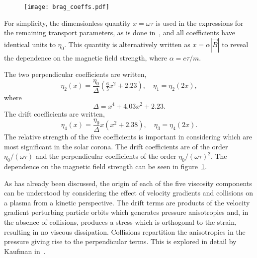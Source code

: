 \begin{figure}[t]
  \centering
  \texttt{[image: brag\_coeffs.pdf]}
\label{fig:visc_dep}%
\end{figure}

For simplicity, the dimensionless quantity $x = \omega \tau$ is used in the expressions for the remaining transport parameters, as is done in~\cite{braginskiiTransportProcessesPlasma1965}, and all coefficients have identical units to $\eta_0$. This quantity is alternatively written as $x = \alpha |\vec{B}|$ to reveal the dependence on the magnetic field strength, where $\alpha = e\tau/m$.

The two perpendicular coefficients are written,
\begin{equation}
  \label{eq:perp_visc_coeff}
  \eta_2(x) = \frac{\eta_0}{\Delta} \left( \tfrac{6}{5} x^2 + 2.23 \right), \quad \eta_1 = \eta_2(2x),
\end{equation}
where
\begin{equation}
  \label{eq:delta}
\Delta = x^4 + 4.03x^2 + 2.23.
\end{equation}
The drift coefficients are written,
\begin{equation}
  \label{eq:drift_visc_coeff}
  \eta_4(x) = \frac{\eta_0}{\Delta} x \left( x^2 + 2.38 \right), \quad \eta_3 = \eta_4(2x).
\end{equation}
The relative strength of the five coefficients is important in considering which are most significant in the solar corona. The drift coefficients are of the order $\eta_0/(\omega \tau)$ and the perpendicular coefficients of the order $\eta_0/(\omega \tau)^2$. The dependence on the magnetic field strength can be seen in figure~\ref{fig:visc_dep}.

As has already been discussed, the origin of each of the five viscosity components can be understood by considering the effect of velocity gradients and collisions on a plasma from a kinetic perspective. The drift terms are products of the velocity gradient perturbing particle orbits which generates pressure anisotropies and, in the absence of collisions, produces a stress which is orthogonal to the strain, resulting in no viscous dissipation. Collisions repartition the anisotropies in the pressure giving rise to the perpendicular terms. This is explored in detail by Kaufman in~\cite{kaufmanPlasmaViscosityMagnetic1960}. 

